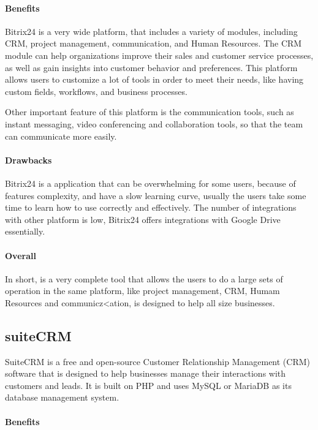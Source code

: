 \documentclass{article}
\begin{document}
\paragraph{Benefits}

Bitrix24 is a very wide platform, that includes a variety of modules, including CRM, project management, communication, and Human Resources. The CRM module can help organizations improve their sales and customer service processes, as well as gain insights into customer behavior and preferences. This platform allows users to customize a lot of tools in order to meet their needs, like having custom fields, workflows, and business processes.

Other important feature of this platform is the communication tools, such as instant messaging, video conferencing and collaboration tools, so that the team can communicate more easily.

\paragraph{Drawbacks}

Bitrix24 is a application that can be overwhelming for some users, because of features complexity, and have a slow learning curve, usually the users take some time to learn how to use correctly and effectively.
The number of integrations with other platform is low, Bitrix24 offers integrations with Google Drive essentially.

\paragraph{Overall}

In short, is a very complete tool that allows the users to do a large sets of operation in the same platform, like project management, CRM, Humam Resources and communicz<ation, is designed to help all size businesses.

\subsection{suiteCRM}

SuiteCRM is a free and open-source Customer Relationship Management (CRM) software that is designed to help businesses manage their interactions with customers and leads. It is built on PHP and uses MySQL or MariaDB as its database management system.

\paragraph{Benefits}
\end{document}
